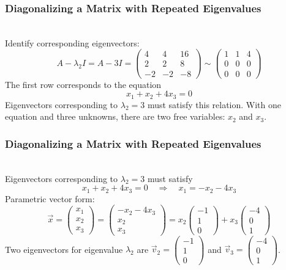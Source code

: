 \begin{frame}\frametitle{Diagonalizing a Matrix with Repeated Eigenvalues}

     \\
    Identify corresponding eigenvectors: 
    $$A - \lambda_2 I = A - 3I = 
    \begin{pmatrix} 4 & 4 & 16 \\ 2 & 2 & 8 \\ -2 & -2 & -8 \end{pmatrix} \sim 
    \begin{pmatrix} 1 & 1 & 4 \\ 0 & 0 & 0 \\ 0 & 0 & 0 \end{pmatrix}
    $$
    \pause The first row corresponds to the equation $$x_1 + x_2 + 4x_3 = 0$$ \pause Eigenvectors corresponding to $\lambda_2=3$ must satisfy this relation. \pause With one equation and three unknowns, there are two free variables: $x_2$ and $x_3$.  
\end{frame}

\begin{frame}\frametitle{Diagonalizing a Matrix with Repeated Eigenvalues}

     \\
    Eigenvectors corresponding to $\lambda_2=3$ must satisfy 
    \pause $$x_1 + x_2 + 4x_3 = 0 \quad \Rightarrow \quad x_1 = -x_2 - 4x_3$$ \pause
    Parametric vector form:
    $$\vec x = \begin{pmatrix} x_1 \\ x_2 \\ x_3  \end{pmatrix} = \begin{pmatrix} -x_2 - 4 x_3 \\ x_2 \\x_3 \end{pmatrix} = x_2\begin{pmatrix} -1 \\ 1 \\0  \end{pmatrix} + x_3 \begin{pmatrix} -4 \\ 0 \\ 1  \end{pmatrix}$$
    \pause Two eigenvectors for eigenvalue $\lambda_2$ are $\vec v_2 = \begin{pmatrix} -1 \\ 1 \\0  \end{pmatrix}$ and $\vec v_3 = \begin{pmatrix} -4 \\ 0 \\ 1  \end{pmatrix}$. 
\end{frame}

